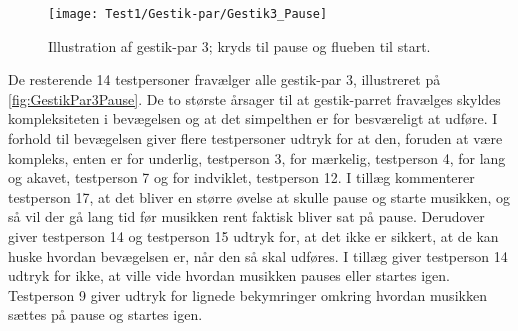 %
\begin{figure}[H]
	\centering
	\texttt{[image: Test1/Gestik-par/Gestik3\_Pause]}
	\caption{Illustration af gestik-par 3; kryds til pause og flueben til start.}
	\label{fig:GestikPar3Pause}
\end{figure}
\noindent
% 
De resterende 14 testpersoner fravælger alle gestik-par 3, illustreret på \autoref{fig:GestikPar3Pause}. De to største årsager til at gestik-parret fravælges skyldes kompleksiteten i bevægelsen og at det simpelthen er for besværeligt at udføre. I forhold til bevægelsen giver flere testpersoner udtryk for at den, foruden at være kompleks, enten er for underlig, testperson 3, for mærkelig, testperson 4, for lang og akavet, testperson 7 og for indviklet, testperson 12. I tillæg kommenterer testperson 17, at det bliver en større øvelse at skulle pause og starte musikken, og så vil der gå lang tid før musikken rent faktisk bliver sat på pause. Derudover giver testperson 14 og testperson 15 udtryk for, at det ikke er sikkert, at de kan huske hvordan bevægelsen er, når den så skal udføres. I tillæg giver testperson 14 udtryk for ikke, at ville vide hvordan musikken pauses eller startes igen. Testperson 9 giver udtryk for lignede bekymringer omkring hvordan musikken sættes på pause og startes igen.

